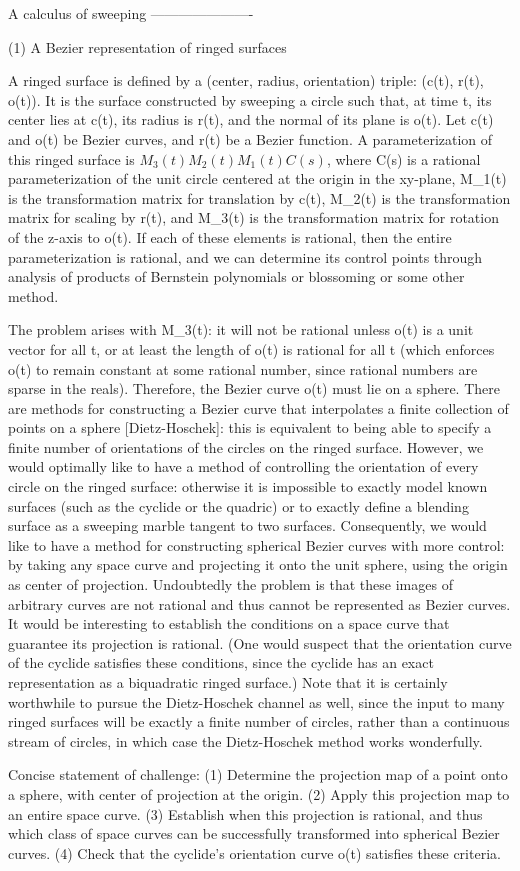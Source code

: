 A calculus of sweeping
----------------------

(1) A Bezier representation of ringed surfaces

A ringed surface is defined by a (center, radius, orientation) triple:
(c(t), r(t), o(t)).  It is the surface constructed by sweeping a circle
such that, at time t, its center lies at c(t), its radius is r(t), and
the normal of its plane is o(t).
Let c(t) and o(t) be Bezier curves, and r(t) be a Bezier function.
A parameterization of this ringed surface is $M_3(t) M_2(t) M_1(t) C(s)$, 
where C(s) is a rational parameterization of the unit circle centered at
the origin in the xy-plane, M_1(t) is the transformation matrix for
translation by c(t), M_2(t) is the transformation matrix for scaling
by r(t), and M_3(t) is the transformation matrix for rotation of the
z-axis to o(t).
If each of these elements is rational, then the entire
parameterization is rational, and we can determine its control
points through analysis of products of Bernstein polynomials or blossoming
or some other method.

The problem arises with M_3(t): it will not be rational unless o(t)
is a unit vector for all t, or at least the length of o(t) is rational
for all t (which enforces o(t) to remain constant at some rational number,
since rational numbers are sparse in the reals).
Therefore, the Bezier curve o(t) must lie on a sphere.
There are methods for constructing a Bezier curve that interpolates a 
finite collection of points on a sphere [Dietz-Hoschek]: this is equivalent
to being able to specify a finite number of orientations of the circles
on the ringed surface.  However, we would optimally like to have a 
method of controlling the orientation of every circle on the ringed 
surface: otherwise it is impossible to exactly model known surfaces
(such as the cyclide or the quadric) or to exactly define a blending 
surface as a sweeping marble tangent to two surfaces.
Consequently, we would like to have a method for constructing spherical
Bezier curves with more control: by taking any space curve
and projecting it onto the unit sphere, using the origin as center of 
projection.  Undoubtedly the problem is that these images of arbitrary 
curves are not rational and thus cannot be represented as Bezier curves.
It would be interesting to establish the conditions on a space curve that 
guarantee its projection is rational.  (One would suspect that the 
orientation curve of the cyclide satisfies these conditions, since the 
cyclide has an exact representation as a biquadratic ringed surface.)
Note that it is certainly worthwhile to pursue the Dietz-Hoschek channel
as well, since the input to many ringed surfaces will be exactly a finite
number of circles, rather than a continuous stream of circles, in which 
case the Dietz-Hoschek method works wonderfully.

Concise statement of challenge: 
             (1) Determine the projection map of a point 
onto a sphere, with center of projection at the origin.
             (2) Apply this projection map to an entire space curve.
             (3) Establish when this projection is rational, and thus 
which class of space curves can be successfully transformed into 
spherical Bezier curves.
             (4) Check that the cyclide's orientation curve o(t) satisfies 
these criteria.

